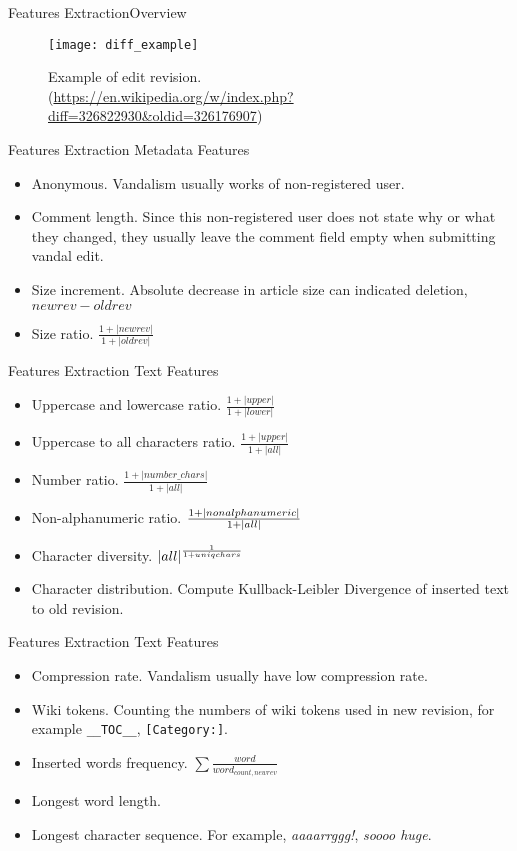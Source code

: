 \documentclass[english]{beamer}
\begin{document}
\begin{frame}{Features Extraction}{Overview}
	\begin{figure}
		\centering
		\texttt{[image: diff\_example]}
		\caption{
			Example of edit revision.\\
			(\url{https://en.wikipedia.org/w/index.php?diff=326822930&oldid=326176907})
		}
	\end{figure}
\end{frame}


\begin{frame}
	{Features Extraction}
	{Metadata Features}
	\begin{itemize}
		\item Anonymous. Vandalism usually works of non-registered user.
		\item Comment length. Since this non-registered user does not state why
		or what they changed, they usually leave the comment field empty when
		submitting vandal edit.
		\item Size increment. Absolute decrease in article size can indicated
		deletion, $ newrev - oldrev $
		\item Size ratio.
			$ \frac{1+|newrev|}{1+|oldrev|} $
	\end{itemize}
\end{frame}

\begin{frame}
	{Features Extraction}
	{Text Features}
	\begin{itemize}
		\item Uppercase and lowercase ratio.
			$ \frac{1+|upper|}{1+|lower|} $
		\item Uppercase to all characters ratio.
			$ \frac{1+|upper|}{1+|all|} $
		\item Number ratio.
			$ \frac{1+|number\_chars|}{1+|all|} $
		\item Non-alphanumeric ratio.
			$ \frac{1+|non\-alphanumeric|}{1+|all|} $
		\item Character diversity.
			$ {|all|}^{\frac{1}{1+uniq\-chars}} $
		\item Character distribution. Compute Kullback-Leibler Divergence of
		inserted text to old revision.
	\end{itemize}
\end{frame}

\begin{frame}
	{Features Extraction}
	{Text Features}
	\begin{itemize}
		\item Compression rate. Vandalism usually have low compression rate.
		\item Wiki tokens. Counting the numbers of wiki tokens used in new
		revision, for example \texttt{\_\_TOC\_\_}, \texttt{[Category:]}.
		\item Inserted words frequency.
			$ \sum{\frac{word}{word_{count,newrev}}} $
		\item Longest word length.
		\item Longest character sequence. For example, \textit{aaaarrggg!},
		\textit{soooo huge}.
	\end{itemize}
\end{frame}
\end{document}
